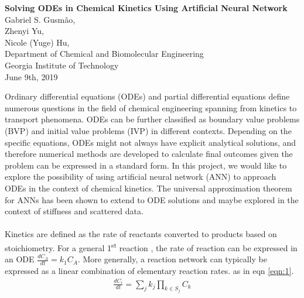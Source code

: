 \documentclass[10pt]{article}
\begin{document}
\begin{center}
    \large \textbf{Solving ODEs in Chemical Kinetics Using Artificial Neural Network \\}
    \vspace{0.5em}
    \normalsize Gabriel S. Gusm\~{a}o\textsuperscript{\textdagger}, \\ Zhenyi Yu\textsuperscript{\textdagger}, \\Nicole (Yuge) Hu\textsuperscript{\textdagger}, \\ 
    \vspace{0.2em}
    \textsuperscript{\textdagger}Department of Chemical and Biomolecular Engineering \\ Georgia Institute of Technology \\
    \vspace{0.2em}
    June 9th, 2019 \\
\end{center}

Ordinary differential equations (ODEs) and partial differential equations define numerous questions in the field of chemical engineering spanning from kinetics to transport phenomena. ODEs can be further classified as boundary value problems (BVP) and initial value problems (IVP) in different contexts. Depending on the specific equations, ODEs might not always have explicit analytical solutions, and therefore numerical methods are developed to calculate final outcomes given the problem can be expressed in a standard form. In this project, we would like to explore the possibility of using artificial neural network (ANN) to approach ODEs in the context of chemical kinetics. The universal approximation theorem for ANNs \textcolor{red}{} has been shown to extend to ODE solutions \textcolor{red}{} and maybe explored in the context of stiffness and scattered data.\\ \\
Kinetics are defined as the rate of reactants converted to products based on stoichiometry. For a general 1\textsuperscript{st} reaction , the rate of reaction can be expressed in an ODE $\frac{dC_A}{dt} = k_1 C_A$. More generally, a reaction network can typically be expressed as a linear combination of elementary reaction rates. as in eqn \ref{eqn:1}.
\begin{align}
    \frac{dC_i}{dt} = \sum_{j} k_j\prod_{k\in S_j} C_{k}
    \label{eqn:1}
\end{align}
\end{document}
